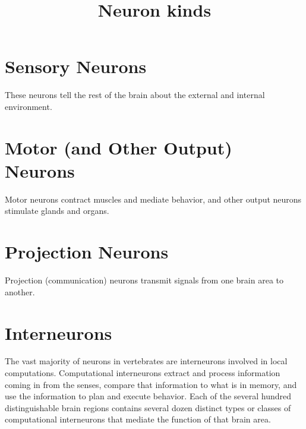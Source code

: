 \documentclass[a4paper]{article}
\title{Neuron kinds}
\date{}
\begin{document}
    \maketitle
    \section{Sensory Neurons}
        These neurons tell the rest of the brain about the external and internal environment.
        
    \section{Motor (and Other Output) Neurons}
        Motor neurons contract muscles and mediate behavior, and other output neurons stimulate glands and organs.
        
    \section{Projection Neurons}
        Projection (communication) neurons transmit signals from one brain area to another.
        
    \section{Interneurons}
        The vast majority of neurons in vertebrates are interneurons involved in local computations. Computational interneurons extract and process information coming in from the senses, compare that information to what is in memory, and use the information to plan and execute behavior. Each of the several hundred distinguishable brain regions contains several dozen distinct types or classes of computational interneurons that mediate the function of that brain area.
\end{document}
